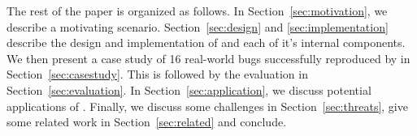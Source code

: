 \noindent
The rest of the paper is organized as follows.
In Section~\ref{sec:motivation}, we describe a motivating scenario.
Section~\ref{sec:design} and \ref{sec:implementation} describe the design and implementation of \parikshan and each of it's internal components.
We then present a case study of 16 real-world bugs successfully reproduced by \parikshan in Section~\ref{sec:casestudy}.
This is followed by the evaluation in Section~\ref{sec:evaluation}.
In Section~\ref{sec:application}, we discuss potential applications of \parikshan. 
Finally, we discuss some challenges in Section~\ref{sec:threats}, give some related work in Section~\ref{sec:related} and conclude.
